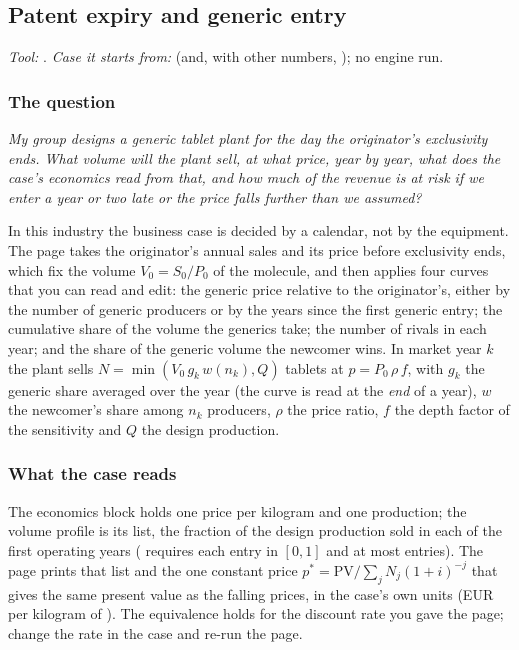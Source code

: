 \documentclass[11pt,a4paper]{article}
\begin{document}
\subsection{Patent expiry and generic entry}\label{sec:edu-patent-expiry}


\noindent\textit{\small Tool:} .  \textit{\small
Case it starts from:} 
(and, with other numbers, ); no engine run.

\subsubsection*{The question}

\emph{My group designs a generic tablet plant for the day the originator's
exclusivity ends.  What volume will the plant sell, at what price, year
by year, what does the case's economics read from that, and how much of
the revenue is at risk if we enter a year or two late or the price falls
further than we assumed?}

In this industry the business case is decided by a calendar, not by the
equipment.  The page takes the originator's annual sales and its price
before exclusivity ends, which fix the volume $V_0=S_0/P_0$ of the
molecule, and then applies four curves that you can read and edit: the
generic price relative to the originator's, either by the number of generic
producers or by the years since the first generic entry; the cumulative
share of the volume the generics take; the number of rivals in each year;
and the share of the generic volume the newcomer wins.  In market year $k$ the
plant sells $N=\min(V_0\,g_k\,w(n_k),Q)$ tablets at $p=P_0\,\rho\,f$, with
$g_k$ the generic share averaged over the year (the curve is read at the
\emph{end} of a year), $w$ the newcomer's share among $n_k$ producers, $\rho$ the
price ratio, $f$ the depth factor of the sensitivity and $Q$ the design production.

\subsubsection*{What the case reads}

The economics block holds one price per kilogram and one production; the
volume profile is its  list, the fraction of the design
production sold in each of the first operating years
( requires each entry in
$[0,1]$ and at most  entries).  The page prints that
list and the one constant price $p^{*}=\mathrm{PV}/\sum_j N_j(1+i)^{-j}$ that gives the
same present value as the falling prices, in the case's own units (EUR per
kilogram of ).  The equivalence holds for the
discount rate you gave the page; change the rate in the case and
re-run the page.
\end{document}
